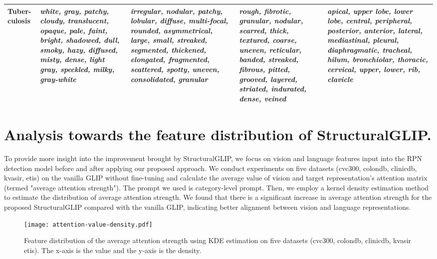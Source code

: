 \begin{longtable}{p{1cm}|p{3cm}|p{3cm}|p{3cm}|p{3cm}}
\hline
\centering Tuber-culosis & 
\textit{white, gray, patchy, cloudy, translucent, opaque, pale, faint, bright, shadowed, dull, smoky, hazy, diffused, misty, dense, light gray, speckled, milky, gray-white} &
\textit{irregular, nodular, patchy, lobular, diffuse, multi-focal, rounded, asymmetrical, large, small, streaked, segmented, thickened, elongated, fragmented, scattered, spotty, uneven, consolidated, granular} &
\textit{rough, fibrotic, granular, nodular, scarred, thick, textured, coarse, uneven, reticular, banded, streaked, fibrous, pitted, grooved, layered, striated, indurated, dense, veined} &
\textit{apical, upper lobe, lower lobe, central, peripheral, posterior, anterior, lateral, mediastinal, pleural, diaphragmatic, tracheal, hilum, bronchiolar, thoracic, cervical, upper, lower, rib, clavicle} \\
\bottomrule
\end{longtable}



\section{Analysis towards the feature distribution of StructuralGLIP.}
\label{app:attn-distribution}
To provide more insight into the improvement brought by StructuralGLIP, we focus on vision and language features input into the RPN detection model before and after applying our proposed approach. We conduct experiments on five datasets (cvc300, colondb, clinicdb, kvasir, etis) on the vanilla GLIP without fine-tuning and calculate the average value of vision and target representation's attention matrix (termed "average attention strength"). The prompt we used is category-level prompt. Then, we employ a kernel density estimation method to estimate the distribution of average attention strength. We found that there is a significant increase in average attention strength for the proposed StructuralGLIP compared with the vanilla GLIP, indicating better alignment between vision and language representations.



\begin{figure}[ht]
  \centering
  \texttt{[image: attention-value-density.pdf]}
  \caption{Feature distribution of the average attention strength using KDE estimation on five datasets (cvc300, colondb, clinicdb, kvasir etis). The x-axis is the value and the y-axis is the density.}
  \label{fig:attention-value-density}
  \vspace{-13pt}
\end{figure}

